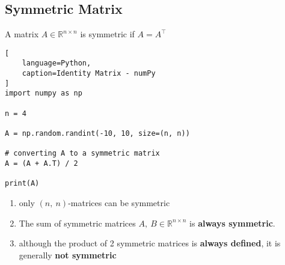 \subsection{Symmetric Matrix}

A matrix $A \in \mathbb{R}^{n\times n}$ is symmetric if $A = A^\top$
\hfill \cite{mfml/book/mml/Deisenroth-Faisal-Ong}


\begin{lstlisting}[
    language=Python,
    caption=Identity Matrix - numPy
]
import numpy as np

n = 4

A = np.random.randint(-10, 10, size=(n, n))

# converting A to a symmetric matrix
A = (A + A.T) / 2

print(A)
\end{lstlisting}

\begin{enumerate}
    \item only $(n,\ n)$-matrices can be symmetric
    \hfill \cite{mfml/book/mml/Deisenroth-Faisal-Ong}

    \item The sum of symmetric matrices $A,\ B \in \mathbb{R}^{n\times n}$ is \textbf{always symmetric}. 
    \hfill \cite{mfml/book/mml/Deisenroth-Faisal-Ong}

    \item although the product of 2 symmetric matrices is \textbf{always defined}, it is generally \textbf{not symmetric}
    \hfill \cite{mfml/book/mml/Deisenroth-Faisal-Ong}
\end{enumerate}







